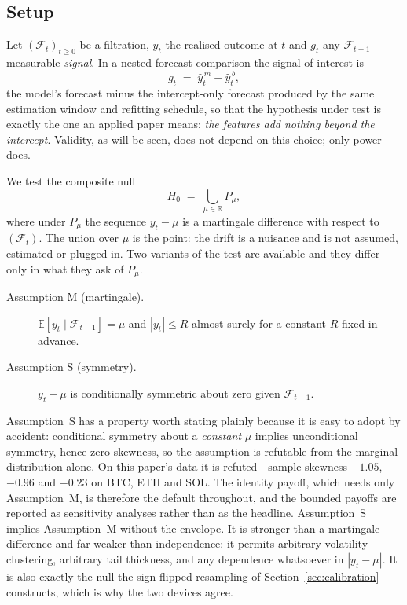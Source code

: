 \documentclass{article}
\theoremstyle{plain}
\theoremstyle{definition}
\begin{document}
\subsection{Setup}

Let $(\mathcal{F}_t)_{t\ge0}$ be a filtration, $y_t$ the realised outcome at $t$ and
$g_t$ any $\mathcal{F}_{t-1}$-measurable \emph{signal}. In a nested forecast comparison the
signal of interest is
%
\begin{equation}
  g_t \;=\; \hat y^{\,m}_t - \hat y^{\,b}_t,
  \label{eq:signal}
\end{equation}
%
the model's forecast minus the intercept-only forecast produced by the same estimation
window and refitting schedule, so that the hypothesis under test is exactly the one an
applied paper means: \emph{the features add nothing beyond the intercept}. Validity, as will
be seen, does not depend on this choice; only power does.

We test the composite null
%
\begin{equation}
  H_0 \;=\; \bigcup_{\mu\in\mathbb{R}} P_\mu,
  \label{eq:null}
\end{equation}
%
where under $P_\mu$ the sequence $y_t-\mu$ is a martingale difference with respect to
$(\mathcal{F}_t)$. The union over $\mu$ is the point: the drift is a nuisance and is not
assumed, estimated or plugged in. Two variants of the test are available and they differ
only in what they ask of $P_\mu$.

\begin{description}
  \item[Assumption M (martingale).] $\mathbb{E}[y_t\mid\mathcal{F}_{t-1}]=\mu$ and
    $|y_t|\le R$ almost surely for a constant $R$ fixed in advance.
  \item[Assumption S (symmetry).] $y_t-\mu$ is conditionally symmetric about zero given
    $\mathcal{F}_{t-1}$.
\end{description}
%
Assumption~S has a property worth stating plainly because it is easy to adopt by accident:
conditional symmetry about a \emph{constant} $\mu$ implies unconditional symmetry, hence zero
skewness, so the assumption is refutable from the marginal distribution alone. On this
paper's data it is refuted---sample skewness $-1.05$, $-0.96$ and $-0.23$ on BTC, ETH and
SOL. The identity payoff, which needs only Assumption~M, is therefore the default throughout,
and the bounded payoffs are reported as sensitivity analyses rather than as the headline.
%
Assumption~S implies Assumption~M without the envelope. It is stronger than a martingale
difference and far weaker than independence: it permits arbitrary volatility clustering,
arbitrary tail thickness, and any dependence whatsoever in $|y_t-\mu|$. It is also exactly
the null the sign-flipped resampling of Section~\ref{sec:calibration} constructs, which is
why the two devices agree.
\end{document}
